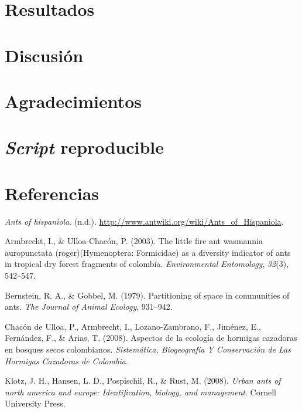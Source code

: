 \documentclass[11pt,]{article}
\begin{document}
\section{Resultados}\label{resultados}

\section{Discusión}\label{discusiuxf3n}

\section{Agradecimientos}\label{agradecimientos}

\section{\texorpdfstring{\emph{Script}
reproducible}{Script reproducible}}\label{script-reproducible}

\section*{Referencias}\label{referencias}

\hypertarget{refs}{}
\hypertarget{ref-AntWiki}{}
\emph{Ants of hispaniola}. (n.d.).
\url{http://www.antwiki.org/wiki/Ants_of_Hispaniola}.

\hypertarget{ref-armbrecht2003little}{}
Armbrecht, I., \& Ulloa-Chacón, P. (2003). The little fire ant wasmannia
auropunctata (roger)(Hymenoptera: Formicidae) as a diversity indicator
of ants in tropical dry forest fragments of colombia.
\emph{Environmental Entomology}, \emph{32}(3), 542--547.

\hypertarget{ref-bernstein1979partitioning}{}
Bernstein, R. A., \& Gobbel, M. (1979). Partitioning of space in
communities of ants. \emph{The Journal of Animal Ecology}, 931--942.

\hypertarget{ref-chacon2008aspectos}{}
Chacón de Ulloa, P., Armbrecht, I., Lozano-Zambrano, F., Jiménez, E.,
Fernández, F., \& Arias, T. (2008). Aspectos de la ecología de hormigas
cazadoras en bosques secos colombianos. \emph{Sistemática, Biogeografía
Y Conservación de Las Hormigas Cazadoras de Colombia}.

\hypertarget{ref-klotz2008urban}{}
Klotz, J. H., Hansen, L. D., Pospischil, R., \& Rust, M. (2008).
\emph{Urban ants of north america and europe: Identification, biology,
and management}. Cornell University Press.
\end{document}
